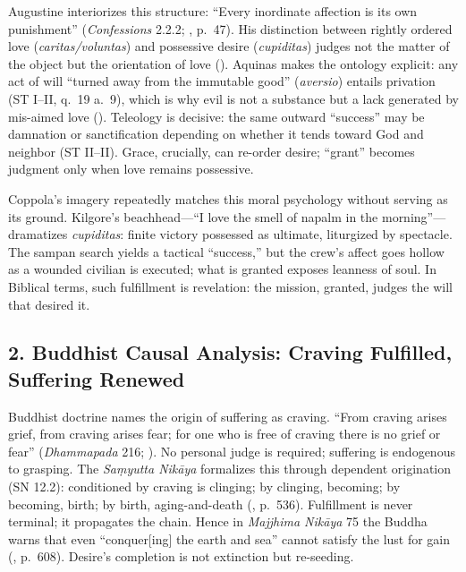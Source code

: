 Augustine interiorizes this structure: ``Every inordinate affection is its own punishment'' (\emph{Confessions} 2.2.2; \parencite{AugustineConfessions1998}, p.~47). His distinction between rightly ordered love (\emph{caritas/voluntas}) and possessive desire (\emph{cupiditas}) judges not the matter of the object but the orientation of love (\parencite{AugustineCity2003}). Aquinas makes the ontology explicit: any act of will ``turned away from the immutable good'' (\emph{aversio}) entails privation (ST I--II, q.~19 a.~9), which is why evil is not a substance but a lack generated by mis-aimed love (\parencite{AquinasST1947}). Teleology is decisive: the same outward ``success'' may be damnation or sanctification depending on whether it tends toward God and neighbor (ST II--II). Grace, crucially, can re-order desire; ``grant'' becomes judgment only when love remains possessive.

Coppola’s imagery repeatedly matches this moral psychology without serving as its ground. Kilgore’s beachhead---``I love the smell of napalm in the morning''---dramatizes \emph{cupiditas}: finite victory possessed as ultimate, liturgized by spectacle. The sampan search yields a tactical ``success,'' but the crew’s affect goes hollow as a wounded civilian is executed; what is granted exposes leanness of soul. In Biblical terms, such fulfillment is revelation: the mission, granted, judges the will that desired it.

\subsection*{2. Buddhist Causal Analysis: Craving Fulfilled, Suffering Renewed}
\label{ssec:2-buddhist-causal-analysis-craving-fulfilled-suffering-renewed}

Buddhist doctrine names the origin of suffering as craving. ``From craving arises grief, from craving arises fear; for one who is free of craving there is no grief or fear'' (\emph{Dhammapada} 216; \parencite{BuddharakkhitaDhp1993}). No personal judge is required; suffering is endogenous to grasping. The \emph{Saṃyutta Nikāya} formalizes this through dependent origination (SN 12.2): conditioned by craving is clinging; by clinging, becoming; by becoming, birth; by birth, aging-and-death (\parencite{BodhiSN2000}, p.~536). Fulfillment is never terminal; it propagates the chain. Hence in \emph{Majjhima Nikāya} 75 the Buddha warns that even ``conquer[ing] the earth and sea'' cannot satisfy the lust for gain (\parencite{NanamoliBodhiMN1995}, p.~608). Desire’s completion is not extinction but re-seeding.

